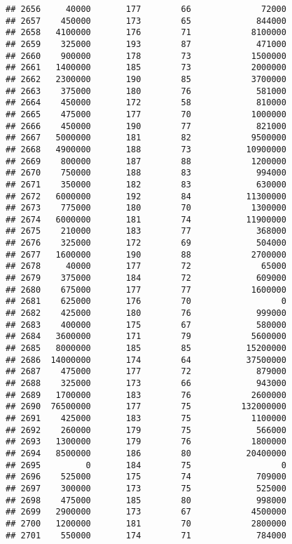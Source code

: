 \documentclass[
]{article}
\begin{document}
\begin{verbatim}
## 2656     40000       177        66              72000
## 2657    450000       173        65             844000
## 2658   4100000       176        71            8100000
## 2659    325000       193        87             471000
## 2660    900000       178        73            1500000
## 2661   1400000       185        73            2000000
## 2662   2300000       190        85            3700000
## 2663    375000       180        76             581000
## 2664    450000       172        58             810000
## 2665    475000       177        70            1000000
## 2666    450000       190        77             821000
## 2667   5000000       181        82            9500000
## 2668   4900000       188        73           10900000
## 2669    800000       187        88            1200000
## 2670    750000       188        83             994000
## 2671    350000       182        83             630000
## 2672   6000000       192        84           11300000
## 2673    775000       180        70            1300000
## 2674   6000000       181        74           11900000
## 2675    210000       183        77             368000
## 2676    325000       172        69             504000
## 2677   1600000       190        88            2700000
## 2678     40000       177        72              65000
## 2679    375000       184        72             609000
## 2680    675000       177        77            1600000
## 2681    625000       176        70                  0
## 2682    425000       180        76             999000
## 2683    400000       175        67             580000
## 2684   3600000       171        79            5600000
## 2685   8000000       185        85           15200000
## 2686  14000000       174        64           37500000
## 2687    475000       177        72             879000
## 2688    325000       173        66             943000
## 2689   1700000       183        76            2600000
## 2690  76500000       177        75          132000000
## 2691    425000       183        75            1100000
## 2692    260000       179        75             566000
## 2693   1300000       179        76            1800000
## 2694   8500000       186        80           20400000
## 2695         0       184        75                  0
## 2696    525000       175        74             709000
## 2697    300000       173        75             525000
## 2698    475000       185        80             998000
## 2699   2900000       173        67            4500000
## 2700   1200000       181        70            2800000
## 2701    550000       174        71             784000

\end{verbatim}
\end{document}
